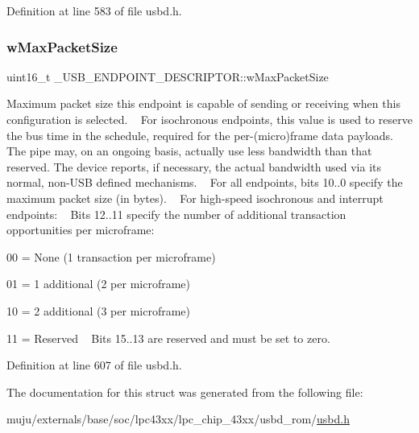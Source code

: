 Definition at line 583 of file usbd.\+h.

\mbox{\label{struct___u_s_b___e_n_d_p_o_i_n_t___d_e_s_c_r_i_p_t_o_r_a534e9e14cebf01c6c7a0644ceed20502}} 
\subsubsection{\texorpdfstring{w\+Max\+Packet\+Size}{wMaxPacketSize}}
{\footnotesize\ttfamily uint16\+\_\+t \+\_\+\+U\+S\+B\+\_\+\+E\+N\+D\+P\+O\+I\+N\+T\+\_\+\+D\+E\+S\+C\+R\+I\+P\+T\+O\+R\+::w\+Max\+Packet\+Size}

Maximum packet size this endpoint is capable of sending or receiving when this configuration is selected. ~\newline
For isochronous endpoints, this value is used to reserve the bus time in the schedule, required for the per-\/(micro)frame data payloads. The pipe may, on an ongoing basis, actually use less bandwidth than that reserved. The device reports, if necessary, the actual bandwidth used via its normal, non-\/\+U\+SB defined mechanisms. ~\newline
For all endpoints, bits 10..0 specify the maximum packet size (in bytes). ~\newline
For high-\/speed isochronous and interrupt endpoints\+: ~\newline
Bits 12..11 specify the number of additional transaction opportunities per microframe\+: ~\newline
\begin{DoxyItemize}
\item 00 = None (1 transaction per microframe) \item 01 = 1 additional (2 per microframe) \item 10 = 2 additional (3 per microframe) \item 11 = Reserved ~\newline
Bits 15..13 are reserved and must be set to zero. \end{DoxyItemize}


Definition at line 607 of file usbd.\+h.



The documentation for this struct was generated from the following file\+:\begin{DoxyCompactItemize}
\item 
muju/externals/base/soc/lpc43xx/lpc\+\_\+chip\+\_\+43xx/usbd\+\_\+rom/\hyperlink{usbd_8h}{usbd.\+h}\end{DoxyCompactItemize}
